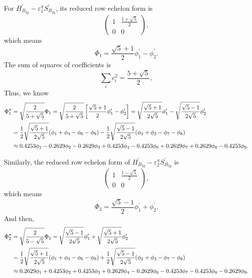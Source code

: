 \documentclass[a4paper]{book}
\newcommand{\Hp}{H^\prime}
\newcommand{\Sp}{S^\prime}
\begin{document}
\begin{solution}
\begin{enumerate}[label=(\alph*)]
		For $\Hp_{B_{2g}}-\varepsilon^\pi_1 \Sp_{B_{2g}}$, its reduced row echelon form is
		\begin{equation*}
			\begin{pmatrix}
				1	& \frac{1+\sqrt{5}}{2}	\\	0	&	0
			\end{pmatrix},
		\end{equation*}
		which means
		\begin{equation*}
			\Phi_1 = \frac{\sqrt{5}+1}{2}\phi^\prime_1 - \phi^\prime_2.
		\end{equation*}
		The sum of squares of coefficients is
		\begin{equation*}
			\sum_{i} c^2_i = \frac{ 5+\sqrt{5} }{2},
		\end{equation*}
		Thus, we know
		\begin{align}
			\Phi^\pi_1 &= \sqrt{ \frac{2}{5+\sqrt{5}} } \Phi_1 = \sqrt{ \frac{2}{5+\sqrt{5}} } \left[ \frac{\sqrt{5}+1}{2}\phi^\prime_1 - \phi^\prime_2 \right] = \sqrt{\frac{\sqrt{5}+1}{2\sqrt{5}}} \phi^\prime_1 - \sqrt{\frac{\sqrt{5}-1}{2\sqrt{5}}} \phi^\prime_2	\notag \\
			&= \frac{1}{2}\sqrt{\frac{\sqrt{5}+1}{2\sqrt{5}}} (\phi_1 + \phi_4 - \phi_6 - \phi_9) - \frac 12 \sqrt{\frac{\sqrt{5}-1}{2\sqrt{5}}} (\phi_2 + \phi_3 - \phi_7 - \phi_8)\notag \\
			&\approx 0.4253 \phi_1 - 0.2629 \phi_2 - 0.2629 \phi_3 + 0.4253 \phi_4 - 0.4253\phi_6 + 0.2629\phi_7 + 0.2629\phi_8 - 0.4253 \phi_9.
		\end{align}
		
		Similarly, the reduced row echelon form of $\Hp_{B_{2g}}-\varepsilon^\pi_2 \Sp_{B_{2g}}$ is
		\begin{equation*}
			\begin{pmatrix}
				1	& \frac{1-\sqrt{5}}{2}	\\	0	&	0
			\end{pmatrix},
		\end{equation*}		
		which means
		\begin{equation*}
			\Phi_2 = \frac{\sqrt{5}-1}{2}\phi^\prime_1 + \phi^\prime_2.
		\end{equation*}
		And then,
		\begin{align}
			\Phi^\pi_2 &= \sqrt{ \frac{2}{5-\sqrt{5}} } \Phi_2 = \sqrt{\frac{\sqrt{5}-1}{2\sqrt{5}}} \phi^\prime_1 + \sqrt{\frac{\sqrt{5}+1}{2\sqrt{5}}} \phi^\prime_2	\notag \\
			&= \frac{1}{2}\sqrt{\frac{\sqrt{5}+1}{2\sqrt{5}}}(\phi_1 + \phi_4 - \phi_6 - \phi_9) + \frac{1}{2}\sqrt{\frac{\sqrt{5}-1}{2\sqrt{5}}} (\phi_2 + \phi_3 - \phi_7 - \phi_8) \notag \\
			&\approx 0.2629 \phi_1 + 0.4253 \phi_2 + 0.4253 \phi_3 + 0.2629 \phi_4 - 0.2629\phi_6 - 0.4253 \phi_7 - 0.4253 \phi_8 - 0.2629 \phi_9.
		\end{align}


\end{enumerate}
\end{solution}
\end{document}
